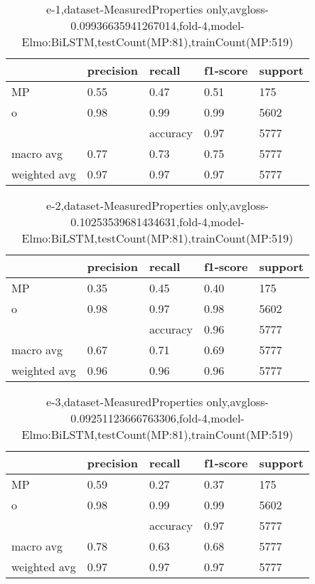 \begin{table}[!ht] 
\centering
\caption{e-1,dataset-MeasuredProperties only,avgloss-0.09936635941267014,fold-4,model-Elmo:BiLSTM,testCount(MP:81),trainCount(MP:519)}\label{e-1data-mpS.tsv}
\begin{tabularx}{300pt}{|X|X|X|X|X|}
\hline
&precision&recall&f1-score&support\\
\hline
MP&0.55&0.47&0.51&175\\
\hline
o&0.98&0.99&0.99&5602\\
\hline
&&accuracy&0.97&5777\\
\hline
macro avg&0.77&0.73&0.75&5777\\
\hline
weighted avg&0.97&0.97&0.97&5777\\
\hline
\end{tabularx}
\end{table}
\begin{table}[!ht] 
\centering
\caption{e-2,dataset-MeasuredProperties only,avgloss-0.10253539681434631,fold-4,model-Elmo:BiLSTM,testCount(MP:81),trainCount(MP:519)}\label{e-2data-mpS.tsv}
\begin{tabularx}{300pt}{|X|X|X|X|X|}
\hline
&precision&recall&f1-score&support\\
\hline
MP&0.35&0.45&0.40&175\\
\hline
o&0.98&0.97&0.98&5602\\
\hline
&&accuracy&0.96&5777\\
\hline
macro avg&0.67&0.71&0.69&5777\\
\hline
weighted avg&0.96&0.96&0.96&5777\\
\hline
\end{tabularx}
\end{table}
\begin{table}[!ht] 
\centering
\caption{e-3,dataset-MeasuredProperties only,avgloss-0.09251123666763306,fold-4,model-Elmo:BiLSTM,testCount(MP:81),trainCount(MP:519)}\label{e-3data-mpS.tsv}
\begin{tabularx}{300pt}{|X|X|X|X|X|}
\hline
&precision&recall&f1-score&support\\
\hline
MP&0.59&0.27&0.37&175\\
\hline
o&0.98&0.99&0.99&5602\\
\hline
&&accuracy&0.97&5777\\
\hline
macro avg&0.78&0.63&0.68&5777\\
\hline
weighted avg&0.97&0.97&0.97&5777\\
\hline
\end{tabularx}
\end{table}
